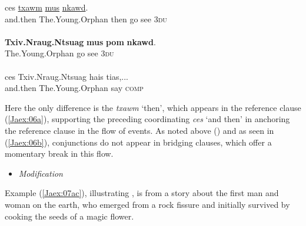 \documentclass[output=paper]{LSP/langsci}
\begin{document}
\begin{exe}
\ex \label{Jaex:06ac}
\begin{xlist}
\ex \label{Jaex:06a}
\gll ces  \underline{} \underline{txawm} \underline{mus} \underline{} \underline{nkawd}.\\
and.then The.Young.Orphan then go see 3\textsc{du}\\
\glt {}\\
\ex \label{Jaex:06b}
\gll \textbf{Txiv.Nraug.Ntsuag} \textbf{mus} \textbf{pom} \textbf{nkawd}.\\
The.Young.Orphan go see 3\textsc{du}\\
\glt {}\\
\ex \label{Jaex:06c}
\gll ces Txiv.Nraug.Ntsuag hais tias,...\\     	      
     and.then The.Young.Orphan say \textsc{comp}\\
\glt {} \citep[][161]{johnson92}
\end{xlist}
\end{exe}

\noindent
Here the only difference is the   \textit{txawm } `then', which appears in the reference clause (\ref{Jaex:06a}), supporting the preceding coordinating  \textit{ces} `and then' in anchoring the reference clause in the  flow of events. As noted above () and as seen in (\ref{Jaex:06b}),  conjunctions do not appear in bridging clauses, which offer a momentary break in this  flow.

%
\begin{itemize}
\item \textit{Modification}
\end{itemize}

Example (\ref{Jaex:07ac}), illustrating , is from a story about the first man and woman on the earth, who emerged from a rock fissure and initially survived by cooking the seeds of a magic flower.
\end{document}
